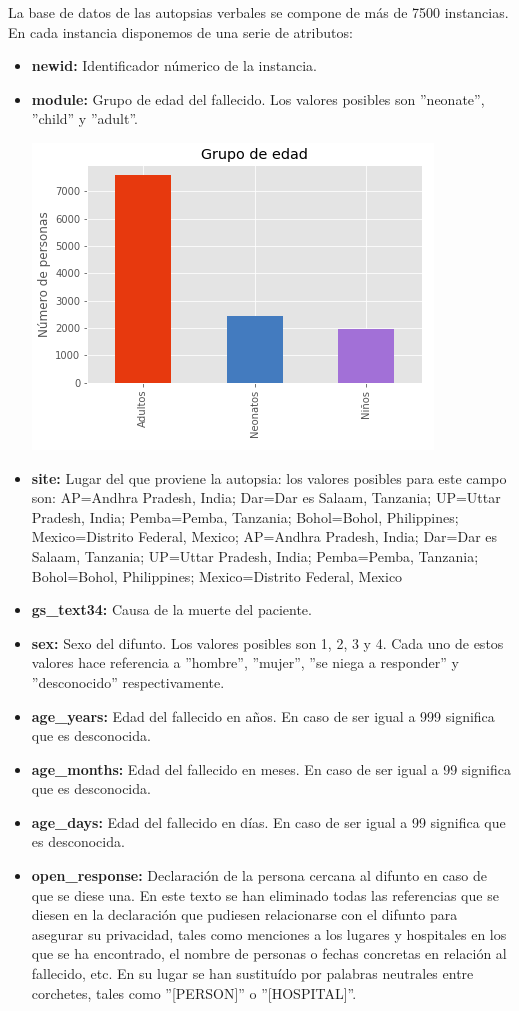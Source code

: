 \documentclass[10pt,a4paper,draft]{article}
\begin{document}
La base de datos de las autopsias verbales se compone de más de 7500 instancias. En cada instancia disponemos de una serie de atributos:

\begin{itemize}
\item \textbf{newid:} Identificador númerico de la instancia.
\item \textbf{module:} Grupo de edad del fallecido. Los valores posibles son ''neonate'', ''child'' y ''adult''.

\includegraphics{figures/plot_grupo_edad.png}
\item \textbf{site:} Lugar del que proviene la autopsia: los valores posibles para este campo son: AP=Andhra Pradesh, India; Dar=Dar es Salaam, Tanzania; UP=Uttar Pradesh, India; Pemba=Pemba, Tanzania; Bohol=Bohol, Philippines; Mexico=Distrito Federal, Mexico; AP=Andhra Pradesh, India; Dar=Dar es Salaam, Tanzania; UP=Uttar Pradesh, India; Pemba=Pemba, Tanzania; Bohol=Bohol, Philippines; Mexico=Distrito Federal, Mexico
\item \textbf{gs\_text34:} Causa de la muerte del paciente.
\item \textbf{sex:} Sexo del difunto. Los valores posibles son 1, 2, 3 y 4. Cada uno de estos valores hace referencia a ''hombre'', ''mujer'', ''se niega a responder'' y ''desconocido'' respectivamente.
\item \textbf{age\_years:} Edad del fallecido en años. En caso de ser igual a 999 significa que es desconocida.
\item \textbf{age\_months:} Edad del fallecido en meses. En caso de ser igual a 99 significa que es desconocida.
\item \textbf{age\_days:} Edad del fallecido en días. En caso de ser igual a 99 significa que es desconocida.
\item \textbf{open\_response:} Declaración de la persona cercana al difunto en caso de que se diese una. En este texto se han eliminado todas las referencias que se diesen en la declaración que pudiesen relacionarse con el difunto para asegurar su privacidad, tales como menciones a los lugares y hospitales en los que se ha encontrado, el nombre de personas o fechas concretas en relación al fallecido, etc. En su lugar se han sustituído por palabras neutrales entre corchetes, tales como ''[PERSON]'' o ''[HOSPITAL]''.
\end{itemize}
\end{document}
